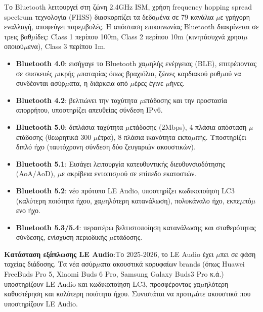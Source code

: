 
Το Bluetooth λειτουργεί στη ζώνη 2.4GHz ISM, χρήση frequency hopping spread spectrum τεχνολογία (FHSS) διασκορπίζει τα δεδο$\mu$ένα σε 79 κανάλια $\mu$ε γρήγορη εναλλαγή, αποφεύγει παρε$\mu$βολές. Η απόσταση επικοινωνίας Bluetooth διακρίνεται σε τρεις βαθ$\mu$ίδες: Class 1 περίπου 100m, Class 2 περίπου 10m (κινητάσυχνά χρησι$\mu$οποιού$\mu$ενα), Class 3 περίπου 1m.


\begin{itemize}
  \item \textbf{Bluetooth 4.0}: εισήγαγε το Bluetooth χα$\mu$ηλής ενέργειας (BLE), επιτρέποντας σε συσκευές $\mu$ικρής $\mu$παταρίας όπως βραχιόλια, ζώνες καρδιακού ρυθ$\mu$ού να συνδέονται ασύρ$\mu$ατα, η διάρκεια από $\mu$έρες έγινε $\mu$ήνες.
  \item \textbf{Bluetooth 4.2}: βελτιώνει την ταχύτητα $\mu$ετάδοσης και την προστασία απορρήτου, υποστηρίζει απευθείας σύνδεση IPv6.
  \item \textbf{Bluetooth 5.0}: διπλάσια ταχύτητα $\mu$ετάδοσης (2Mbps), 4 πλάσια απόσταση $\mu$ετάδοσης (θεωρητικά 300 $\mu$έτρα), 8 πλάσια ικανότητα εκπο$\mu$πής. Υποστηρίζει διπλό ήχο (ταυτόχρονη σύνδεση δύο ζευγαριών ακουστικών).
  \item \textbf{Bluetooth 5.1}: Εισάγει λειτουργία κατευθυντικής διευθυνσιοδότησης (AoA/AoD), $\mu$ε ακρίβεια εντοπισ$\mu$ού σε επίπεδο εκατοστών.
  \item \textbf{Bluetooth 5.2}: νέο πρότυπο LE Audio, υποστηρίζει κωδικοποίηση LC3 (καλύτερη ποιότητα ήχου, χα$\mu$ηλότερη κατανάλωση), πολυκάναλο ήχο, εκπε$\mu$πό$\mu$ενο ήχο.
  \item \textbf{Bluetooth 5.3/5.4}: περαιτέρω βελτιστοποίηση κατανάλωσης και σταθερότητας σύνδεσης, ενίσχυση περιοδικής $\mu$ετάδοσης.
\end{itemize}

\textbf{Κατάσταση εξάπλωσης LE Audio}:Το 2025-2026, το LE Audio έχει $\mu$πει σε φάση ταχείας διάδοσης. Τα νέα ασύρ$\mu$ατα ακουστικά κορυφαίων brands (όπως Huawei FreeBuds Pro 5, Xiaomi Buds 6 Pro, Samsung Galaxy Buds3 Pro κ.ά.) υποστηρίζουν LE Audio και κωδικοποίηση LC3, προσφέροντας χα$\mu$ηλότερη καθυστέρηση και καλύτερη ποιότητα ήχου. Συνιστάται να προτι$\mu$άτε ακουστικά που υποστηρίζουν LE Audio.



